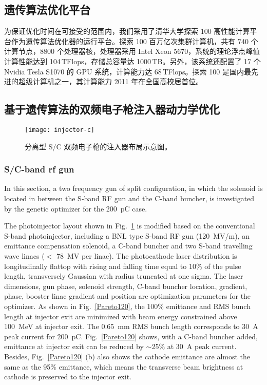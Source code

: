\subsection{遗传算法优化平台}
为保证优化时间在可接受的范围内，我们采用了清华大学探索 100 高性能计算平台作为遗传算法优化器的运行平台。探索 100 百万亿次集群计算机，共有 740 个计算节点，8800 个处理器核，处理器采用 Intel Xeon 5670，系统的理论浮点峰值计算性能达到 104\,TFlops，存储总容量达 1000\,TB。另外，该系统还配置了 17 个 Nvidia Tesla S1070 的 GPU 系统，计算能力达 68\,TFlops。探索 100 是国内最先进的超级计算机之一，其计算能力 2011 年在全国高校居首位。


\subsection{基于遗传算法的双频电子枪注入器动力学优化}

\begin{figure}[htbp]
	\centering
	\texttt{[image: injector-c]}	
	\caption{分离型 S/C 双频电子枪的注入器布局示意图。}
	\label{fig:injector-c}
\end{figure}

\subsubsection{S/C-band rf gun}
In this section, a two frequency gun of split configuration, in which the solenoid is located in between the S-band RF gun and the C-band buncher, is investigated by the genetic optimizer for the \SI{200}{pC} case.

The photoinjector layout shown in Fig.~\ref{fig:injector-c} is modified based on the conventional S-band photoinjector, including a BNL type S-band RF gun (\SI{120}{MV/m}), an emittance compensation solenoid, a C-band buncher and two S-band travelling wave linacs ($<$ \SI{78}{MV} per linac). The photocathode laser distribution is longitudinally flattop with rising and falling time equal to 10\% of the pulse length, transversely Gaussian with radius truncated at one sigma. The laser dimensions, gun phase, solenoid strength, C-band buncher location, gradient, phase, booster linac gradient and position are optimization parameters for the optimizer. As shown in Fig.~\ref{Pareto120}, the 100\% emittance and RMS bunch length at injector exit are minimized with beam energy constrained above \SI{100}{MeV} at injector exit. The \SI{0.65}{mm} RMS bunch length corresponds to \SI{30}{A} peak current for \SI{200}{pC}. Fig.~\ref{Pareto120} shows, with a C-band buncher added, emittance at injector exit can be reduced by $\sim$25\% at \SI{30}{A} peak current. Besides, Fig.~\ref{Pareto120} (b) also shows the cathode emittance are almost the same as the 95\% emittance, which means the transverse beam brightness at cathode is preserved to the injector exit.

